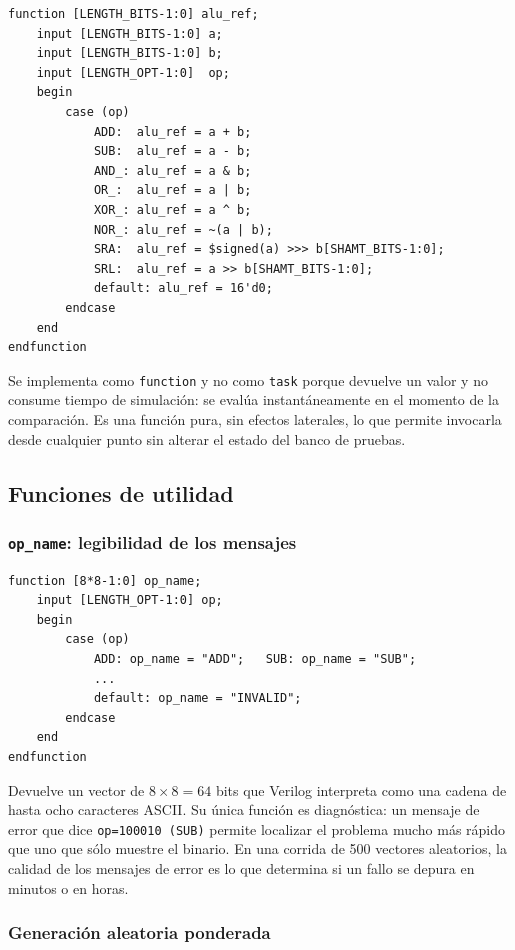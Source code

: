 \documentclass[12pt,a4paper]{article}
\begin{document}
\begin{lstlisting}[caption={Modelo de referencia \texttt{alu\_ref}.},label={lst:ref}]
function [LENGTH_BITS-1:0] alu_ref;
    input [LENGTH_BITS-1:0] a;
    input [LENGTH_BITS-1:0] b;
    input [LENGTH_OPT-1:0]  op;
    begin
        case (op)
            ADD:  alu_ref = a + b;
            SUB:  alu_ref = a - b;
            AND_: alu_ref = a & b;
            OR_:  alu_ref = a | b;
            XOR_: alu_ref = a ^ b;
            NOR_: alu_ref = ~(a | b);
            SRA:  alu_ref = $signed(a) >>> b[SHAMT_BITS-1:0];
            SRL:  alu_ref = a >> b[SHAMT_BITS-1:0];
            default: alu_ref = 16'd0;
        endcase
    end
endfunction
\end{lstlisting}

Se implementa como \texttt{function} y no como \texttt{task} porque devuelve un
valor y no consume tiempo de simulación: se evalúa instantáneamente en el
momento de la comparación. Es una función pura, sin efectos laterales, lo que
permite invocarla desde cualquier punto sin alterar el estado del banco de
pruebas.

\subsection{Funciones de utilidad}
\label{sec:util}

\subsubsection{\texttt{op\_name}: legibilidad de los mensajes}

\begin{lstlisting}[caption={Conversión de opcode a nombre legible.}]
function [8*8-1:0] op_name;
    input [LENGTH_OPT-1:0] op;
    begin
        case (op)
            ADD: op_name = "ADD";   SUB: op_name = "SUB";
            ...
            default: op_name = "INVALID";
        endcase
    end
endfunction
\end{lstlisting}

Devuelve un vector de $8 \times 8 = 64$ bits que Verilog interpreta como una
cadena de hasta ocho caracteres ASCII. Su única función es diagnóstica: un
mensaje de error que dice \texttt{op=100010 (SUB)} permite localizar el problema
mucho más rápido que uno que sólo muestre el binario. En una corrida de 500
vectores aleatorios, la calidad de los mensajes de error es lo que determina si
un fallo se depura en minutos o en horas.

\subsubsection{Generación aleatoria ponderada}
\label{sec:random}
\end{document}
